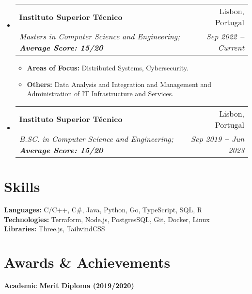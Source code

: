 \documentclass[letterpaper,11pt]{article}
\makeatletter
\newcommand{\resumeItem}[1]{
  \item\small{
    {#1 \vspace{-2pt}}
  }
}
\newcommand{\resumeSubheading}[4]{
  \vspace{-2pt}\item
    \begin{tabular*}{0.97\textwidth}[t]{l@{\extracolsep{\fill}}r}
      \textbf{#1} & #2 \\
      \textit{\small#3} & \textit{\small #4} \\
    \end{tabular*}\vspace{-7pt}
}
\newcommand{\resumeSubHeadingListStart}{\begin{itemize}[leftmargin=0.15in, label={}]}
\newcommand{\resumeSubHeadingListEnd}{\end{itemize}}
\newcommand{\resumeItemListStart}{\begin{itemize}}
\newcommand{\resumeItemListEnd}{\end{itemize}\vspace{-5pt}}
\makeatother
\begin{document}
\vspace{2pt}

\resumeSubHeadingListStart

\resumeSubheading{Instituto Superior Técnico \normalfont{(IST)}}{Lisbon, Portugal}
{Masters in Computer Science and Engineering; \textbf{Average Score: 15/20}}{Sep 2022 \textbf{--} Current}

\resumeItemListStart
\resumeItem{
  \textbf{Areas of Focus:} Distributed Systems, Cybersecurity. }
\resumeItem{
  \textbf{Others:} Data Analysis and Integration and Management and Administration of IT Infrastructure and Services.}
\resumeItemListEnd

\resumeSubheading{Instituto Superior Técnico \normalfont{(IST)}}{Lisbon, Portugal}
{B.SC. in Computer Science and Engineering; \textbf{Average Score: 15/20}}{Sep 2019 \textbf{--} Jun 2023}

\resumeSubHeadingListEnd


\section{Skills}

\vspace{2pt}

\resumeSubHeadingListStart
\small{\item{
              \textbf{Languages:}{ C/C++, C\#, Java, Python, Go, TypeScript, SQL, R} \\ \vspace{3pt}
              \textbf{Technologies:}{ Terraform, Node.js, PostgresSQL, Git, Docker, Linux} \\ \vspace{3pt}
              \textbf{Libraries:}{ Three.js, TailwindCSS } \\ \vspace{3pt}

        }}
\resumeSubHeadingListEnd


\section{Awards \& Achievements}
\vspace{2pt}
\resumeSubHeadingListStart
\small{\item{
              \textbf{Academic Merit Diploma (2019/2020)}{}
        }}
\resumeSubHeadingListEnd
\end{document}
